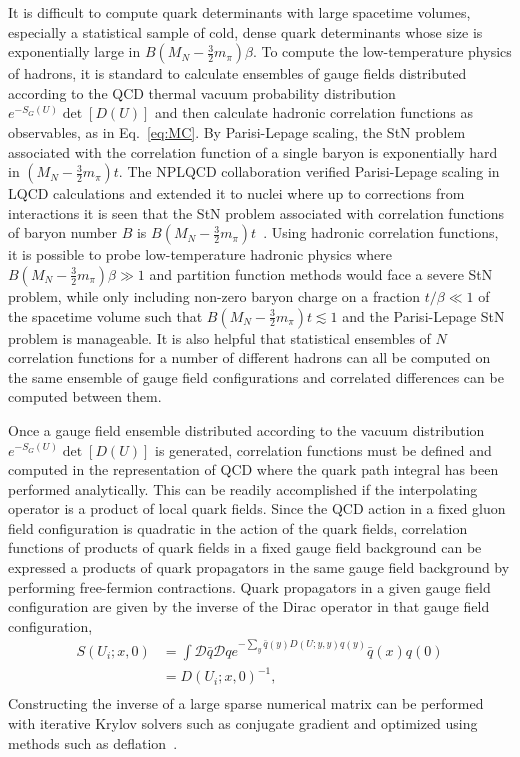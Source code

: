 It is difficult to compute quark determinants with large spacetime volumes,
especially a statistical sample of cold, dense quark determinants whose size is exponentially large in $B(M_N - \frac{3}{2}m_\pi)\beta$.
To compute the low-temperature physics of hadrons, 
it is standard to calculate ensembles of gauge fields distributed according to the QCD thermal vacuum probability distribution $e^{-S_G(U)}\det[D(U)]$
and then calculate hadronic correlation functions as observables, as in Eq.~\eqref{eq:MC}.
By Parisi-Lepage scaling, the StN problem associated with the correlation function of a single baryon is exponentially hard in $(M_N - \frac{3}{2}m_\pi)t$.
The NPLQCD collaboration verified Parisi-Lepage scaling in LQCD calculations and extended it to nuclei where up to corrections from interactions it is seen that the StN problem associated with correlation functions of baryon number $B$ is $B(M_N - \frac{3}{2}m_\pi)t$~\cite{Beane:2009kya}.
Using hadronic correlation functions, it is possible to probe low-temperature hadronic physics where $B(M_N - \frac{3}{2}m_\pi)\beta \gg 1$ and partition function methods would face a severe StN problem,
while only including non-zero baryon charge on a fraction $t/\beta \ll 1$ of the spacetime volume such that $B(M_N - \frac{3}{2}m_\pi)t \lesssim 1$ and the Parisi-Lepage StN problem is manageable.
It is also helpful that statistical ensembles of $N$ correlation functions for a number of different hadrons can all be computed on the same ensemble of gauge field configurations and correlated differences can be computed between them.


Once a gauge field ensemble distributed according to the vacuum distribution $e^{-S_G(U)}\det[D(U)]$ is generated, correlation functions must be defined and computed in the representation of QCD where the quark path integral has been performed analytically.
This can be readily accomplished if the interpolating operator is a product of local quark fields.
Since the QCD action in a fixed gluon field configuration is quadratic in the action of the quark fields,
correlation functions of products of quark fields in a fixed gauge field background
can be expressed a products of quark propagators in the same gauge field background
by performing free-fermion contractions.
Quark propagators in a given gauge field configuration are given by the inverse of the Dirac operator in that gauge field configuration,
\begin{equation}
  \begin{split}
    S(U_i;x,0) &= \int \mathcal{D}\bar{q}\mathcal{D}q e^{-\sum_y \bar{q}(y)D(U;y,y)q(y)} \bar{q}(x)q(0) \\
    &= D(U_i;x,0)^{-1}, \\
  \end{split}\label{propdef}
\end{equation}
Constructing the inverse of a large sparse numerical matrix can be performed with iterative Krylov solvers such as conjugate gradient and optimized using methods such as deflation~\cite{Stathopoulos:2007zi}.

